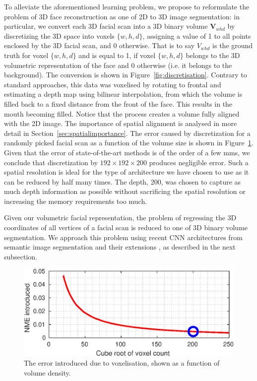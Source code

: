 To alleviate the aforementioned learning problem, we propose to
reformulate the problem of 3D face reconstruction as one of 2D to 3D
image segmentation: in particular, we convert each 3D facial scan into
a 3D binary volume $\mathbf{V}_{whd}$ by discretizing the 3D space
into voxels $\{w,h,d\}$, assigning a value of 1 to all points enclosed
by the 3D facial scan, and 0 otherwise. That is to say $ V_{whd}$ is
the ground truth for voxel $\{w,h,d\}$ and is equal to 1, if voxel
$\{w,h,d\}$ belongs to the 3D volumetric representation of the face
and 0 otherwise (i.e. it belongs to the background). The conversion is
shown in Figure~\ref{fig:discretisation}. Contrary to standard
approaches, this data was voxelised by rotating to frontal and
estimating a depth map using bilinear interpolation, from which the
volume is filled back to a fixed distance from the front of the
face. This results in the mouth becoming filled. Notice that the
process creates a volume fully aligned with the 2D image. The
importance of spatial alignment is analysed in more detail in
Section~\ref{sec:spatialimportance}. The error caused by
discretization for a randomly picked facial scan as a function of the
volume size is shown in Figure~\ref{fig:voxerror}. Given that the
error of state-of-the-art methods \cite{roth2016adaptive,liu2016joint}
is of the order of a few mms, we conclude that discretization by
$192\times 192\times 200$ produces negligible error. Such a spatial
resolution is ideal for the type of architecture we have chosen to use
as it can be reduced by half many times. The depth, 200, was chosen to
capture as much depth information as possible without sacrificing the
spatial resolution or increasing the memory requirements too much.

Given our volumetric facial representation, the problem of regressing
the 3D coordinates of all vertices of a facial scan is reduced to one
of 3D binary volume segmentation. We approach this problem using
recent CNN architectures from semantic image segmentation
\cite{long2015fully} and their extensions \cite{newell2016stacked}, as
described in the next subsection.

\begin{figure}
  \centering
  \includegraphics[width=0.9\linewidth]{curves/voxerror.eps}
  \caption[Error due to voxelisation]{The error introduced due to
    voxelisation, shown as a function of volume density.}
  \label{fig:voxerror}
\end{figure}

